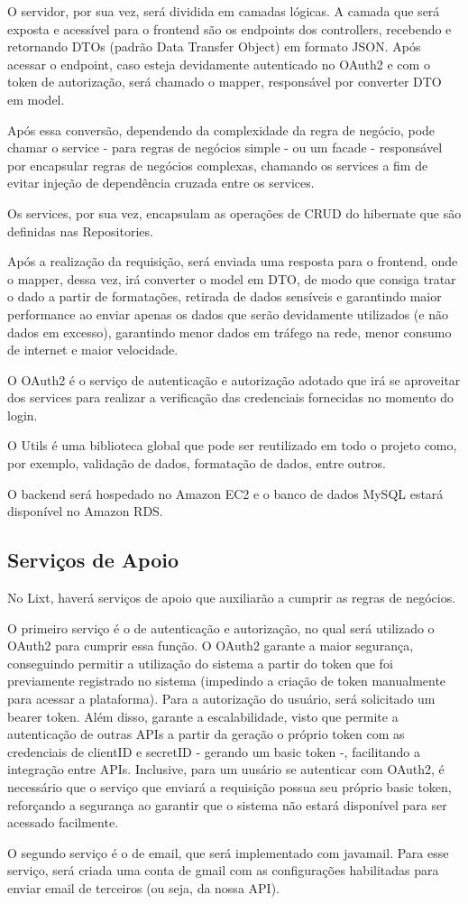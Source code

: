 O servidor, por sua vez, será dividida em camadas lógicas. A camada que será exposta e acessível para o frontend são os endpoints dos controllers, recebendo e retornando DTOs (padrão Data Transfer Object) em formato JSON. Após acessar o endpoint, caso esteja devidamente autenticado no OAuth2 e com o token de autorização, será chamado o mapper, responsável por converter DTO em model.

Após essa conversão, dependendo da complexidade da regra de negócio, pode chamar o service - para regras de negócios simple -  ou um facade - responsável por encapsular regras de negócios complexas, chamando os services a fim de evitar injeção de dependência cruzada entre os services. 

Os services, por sua vez, encapsulam as operações de CRUD do hibernate que são definidas nas Repositories.

Após a realização da requisição, será enviada uma resposta para o frontend, onde o mapper, dessa vez, irá converter o model em DTO, de modo que consiga tratar o dado a partir de formatações, retirada de dados sensíveis e garantindo maior performance ao enviar apenas os dados que serão devidamente utilizados (e não dados em excesso), garantindo menor dados em tráfego na rede, menor consumo de internet e maior velocidade.

O OAuth2 é o serviço de autenticação e autorização adotado que irá se aproveitar dos services para realizar a verificação das credenciais fornecidas no momento do login.

O Utils é uma biblioteca global que pode ser reutilizado em todo o projeto como, por exemplo, validação de dados, formatação de dados, entre outros.

O backend será hospedado no Amazon EC2 e o banco de dados MySQL estará disponível no Amazon RDS.

\subsection{Serviços de Apoio}

No Lixt, haverá serviços de apoio que auxiliarão a cumprir as regras de negócios. 

O primeiro serviço é o de autenticação e autorização, no qual será utilizado o OAuth2 para cumprir essa função. O OAuth2 garante a maior segurança, conseguindo permitir a utilização do sistema a partir do token que foi previamente registrado no sistema (impedindo a criação de token manualmente para acessar a plataforma). Para a autorização do usuário, será solicitado um bearer token. Além disso, garante a escalabilidade, visto que permite a autenticação de outras APIs a partir da geração o próprio token com as credenciais de clientID e secretID - gerando um basic token -, facilitando a integração entre APIs. Inclusive, para um uusário se autenticar com OAuth2, é necessário que o serviço que enviará a requisição possua seu próprio basic token, reforçando a segurança ao garantir que o sistema não estará disponível para ser acessado facilmente.

O segundo serviço é o de email, que será implementado com javamail. Para esse serviço, será criada uma conta de gmail com as configurações habilitadas para enviar email de terceiros (ou seja, da nossa API).
